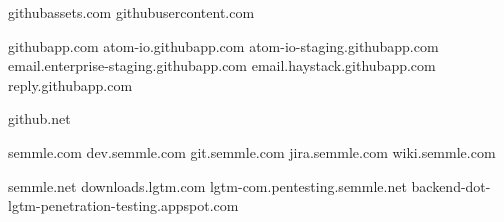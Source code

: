 

githubassets.com
githubusercontent.com

githubapp.com
        atom-io.githubapp.com
        atom-io-staging.githubapp.com
        email.enterprise-staging.githubapp.com
        email.haystack.githubapp.com
        reply.githubapp.com


github.net

semmle.com
    dev.semmle.com
    git.semmle.com
    jira.semmle.com
    wiki.semmle.com

semmle.net
downloads.lgtm.com
lgtm-com.pentesting.semmle.net
backend-dot-lgtm-penetration-testing.appspot.com
